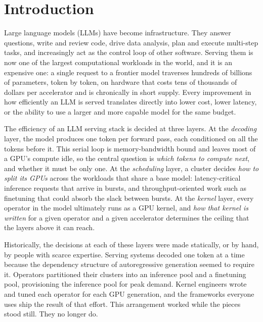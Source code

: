 \chapter{Introduction}
\label{ch:intro}

Large language models (LLMs) have become infrastructure.
They answer questions, write and review code, drive data analysis, plan and execute multi-step tasks, and increasingly act as the control loop of other software.
Serving them is now one of the largest computational workloads in the world, and it is an expensive one: a single request to a frontier model traverses hundreds of billions of parameters, token by token, on hardware that costs tens of thousands of dollars per accelerator and is chronically in short supply.
Every improvement in how efficiently an LLM is served translates directly into lower cost, lower latency, or the ability to use a larger and more capable model for the same budget.

The efficiency of an LLM serving stack is decided at three layers.
At the \emph{decoding} layer, the model produces one token per forward pass, each conditioned on all the tokens before it.
This serial loop is memory-bandwidth bound and leaves most of a GPU's compute idle, so the central question is \emph{which tokens to compute next}, and whether it must be only one.
At the \emph{scheduling} layer, a cluster decides \emph{how to split its GPUs} across the workloads that share a base model: latency-critical inference requests that arrive in bursts, and throughput-oriented work such as finetuning that could absorb the slack between bursts.
At the \emph{kernel} layer, every operator in the model ultimately runs as a GPU kernel, and \emph{how that kernel is written} for a given operator and a given accelerator determines the ceiling that the layers above it can reach.

Historically, the decisions at each of these layers were made statically, or by hand, by people with scarce expertise.
Serving systems decoded one token at a time because the dependency structure of autoregressive generation seemed to require it.
Operators partitioned their clusters into an inference pool and a finetuning pool, provisioning the inference pool for peak demand.
Kernel engineers wrote and tuned each operator for each GPU generation, and the frameworks everyone uses ship the result of that effort.
This arrangement worked while the pieces stood still.
They no longer do.

